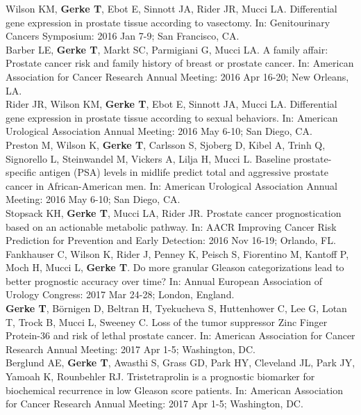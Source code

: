 \documentclass[11pt, a4paper]{article} %
\begin{document}
Wilson KM, {\bf Gerke T}, Ebot E, Sinnott JA, Rider JR, Mucci LA. Differential gene expression in prostate tissue according to vasectomy. In: Genitourinary Cancers Symposium: 2016 Jan 7-9; San Francisco, CA.\\

Barber LE, {\bf Gerke T}, Markt SC, Parmigiani G, Mucci LA. A family affair: Prostate cancer risk and family history of breast or prostate cancer. In: American Association for Cancer Research Annual Meeting: 2016 Apr 16-20; New Orleans, LA.\\

Rider JR, Wilson KM, {\bf Gerke T}, Ebot E, Sinnott JA, Mucci LA. Differential gene expression in prostate tissue according to sexual behaviors. In: American Urological Association Annual Meeting: 2016 May 6-10; San Diego, CA.\\

Preston M, Wilson K, {\bf Gerke T}, Carlsson S, Sjoberg D, Kibel A, Trinh Q, Signorello L, Steinwandel M, Vickers A, Lilja H, Mucci L. Baseline prostate-specific antigen (PSA) levels in midlife predict total and aggressive prostate cancer in African-American men. In: American Urological Association Annual Meeting: 2016 May 6-10; San Diego, CA.\\

Stopsack KH, {\bf Gerke T}, Mucci LA, Rider JR. Prostate cancer prognostication based on an actionable metabolic pathway. In: AACR Improving Cancer Risk Prediction for Prevention and Early Detection: 2016 Nov 16-19; Orlando, FL.\\%

Fankhauser C, Wilson K, Rider J, Penney K, Peisch S, Fiorentino M, Kantoff P, Moch H, Mucci L, {\bf Gerke T}. Do more granular Gleason categorizations lead to better prognostic accuracy over time? In: Annual European Association of Urology Congress: 2017 Mar 24-28; London, England.\\

{\bf Gerke T},  B\"{o}rnigen D, Beltran H, Tyekucheva S, Huttenhower C, Lee G, Lotan T, Trock B, Mucci L, Sweeney C. Loss of the tumor suppressor Zinc Finger Protein-36 and risk of lethal prostate cancer. In: American Association for Cancer Research Annual Meeting: 2017 Apr 1-5; Washington, DC.\\

Berglund AE, {\bf Gerke T}, Awasthi S, Grass GD, Park HY, Cleveland JL, Park JY, Yamoah K, Rounbehler RJ. Tristetraprolin is a prognostic biomarker for biochemical recurrence in low Gleason score patients. In: American Association for Cancer Research Annual Meeting: 2017 Apr 1-5; Washington, DC.\\
\end{document}
